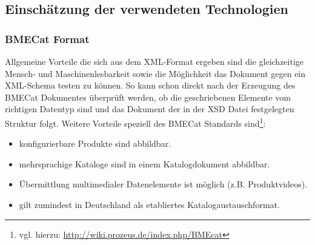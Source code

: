 				
		

		

	
	\subsection{Einschätzung der verwendeten Technologien}

	
	\subsubsection{BMECat Format}
	
	Allgemeine Vorteile die sich aus dem XML-Format ergeben sind die gleichzeitige Mensch- und Maschinenlesbarkeit sowie die Möglichkeit das Dokument gegen ein XML-Schema testen zu können. So kann schon direkt nach der Erzeugung des BMECat Dokumentes überprüft werden, ob die geschriebenen Elemente vom richtigen Datentyp sind und das Dokument der in der XSD Datei festgelegten Struktur folgt. Weitere Vorteile speziell des BMECat Standards sind\footnote{vgl. hierzu: \url{http://wiki.prozeus.de/index.php/BMEcat}}:
	
	\begin{itemize}[noitemsep]
	\item konfigurierbare Produkte sind abbildbar.
	\item mehrsprachige Kataloge sind in einem Katalogdokument abbildbar.
	\item Übermittlung multimedialer Datenelemente ist möglich (z.B. Produktvideos).
	\item gilt zumindest in Deutschland als etabliertes Katalogaustauschformat.
	\end{itemize}
	
